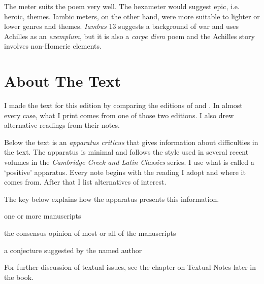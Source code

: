 The meter suits the poem very well.  The hexameter would suggest epic, i.e.  heroic, themes.  Iambic meters, on the other hand, were more suitable to lighter or lower genres and themes.  \textit{Iambus} 13 suggests a background of war and uses Achilles as an \textit{exemplum}, but it is also a \textit{carpe diem} poem and the Achilles story involves non-Homeric elements.


\section*{About The Text}

I made the text for this edition by comparing the editions of \citet{sb1985} and \citet{mankin1995}. In almost every case, what I print comes from one of those two editions. I also drew alternative readings from their notes.

Below the text is an \textit{apparatus criticus} that gives information about difficulties in the text.  The apparatus is minimal and follows the style used in several recent volumes in the \textit{Cambridge Greek and Latin Classics} series.  I use what is called a `positive' apparatus.  Every note begins with the reading I adopt and where it comes from.  After that I list alternatives of interest.  

The key below explains how the apparatus presents this information.

\begin{description}%
    [style=sameline,leftmargin=70pt,labelwidth=\widthof{\textbf{Name}}]
    \item[m] one or more manuscripts
    \item[mss] the consensus opinion of most or all of the manuscripts
    \item[Name] a conjecture suggested by the named author
\end{description}

For further discussion of textual issues, see the chapter on Textual Notes later in the book.

